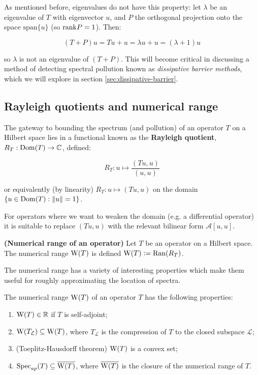 \documentclass[../main.tex]{subfiles}
\begin{document}
\begin{remark}
As mentioned before, eigenvalues do not have this property: let $\lambda$ be an eigenvalue of $T$ with eigenvector $u$, and $P$ the orthogonal 
projection onto the space $\mathrm{span}\{u\}$ (so $\mathrm{rank} P = 1$). Then:

$$(T+P) u = Tu + u = \lambda u + u = (\lambda + 1)u$$

so $\lambda$ is not an eigenvalue of $(T+P)$. This will become critical in discussing a method of detecting spectral pollution known as 
\emph{dissipative barrier methods}, which we will explore in section \ref{sec:dissipative-barrier}.
\end{remark}

\subsection{Rayleigh quotients and numerical range}
The gateway to bounding the spectrum (and pollution) of an operator $T$ on a Hilbert space lies in a functional known as the \textbf{Rayleigh quotient}, $R_T: \mathrm{Dom}(T) \rightarrow \mathbb{C}$, defined:

 \begin{equation*}
 R_T: u \mapsto \frac{( Tu, u )}{(u, u)}
 \end{equation*}
 
 or equivalently (by linearity) $R_T: u \mapsto (Tu, u)$ on the domain $\{u \in \mathrm{Dom}(T) : \|u\| = 1\}$.
 
 For operators where we want to weaken the domain (e.g. a differential operator) it is suitable to replace $(Tu, u)$ with the relevant bilinear form $\mathcal{A}[u, u].$

\begin{definition}{\textbf{(Numerical range of an operator)}} Let $T$ be an operator on a Hilbert space. The
numerical range $\mathrm{W}(T)$ is defined $\mathrm{W}(T) \mathrel{\mathop:}= \mathrm{Ran}(R_T)$.
\end{definition}

The numerical range has a variety of interesting properties which make them useful for roughly approximating
the location of spectra.

\begin{proposition}\label{thm:num-range-props}
The numerical range $\mathrm{W}(T)$ of an operator $T$ has the following properties:
\begin{enumerate}
\item\label{item:num-in-R} $\mathrm{W}(T) \in \mathbb{R}$ if $T$ is self-adjoint;
\item\label{item:proj-num-range} $\mathrm{W}(T_\mathcal{L}) \subseteq \mathrm{W}(T)$, where $T_\mathcal{L}$ is the compression of $T$ to the closed subspace $\mathcal{L}$;
\item (Toeplitz-Hausdorff theorem)\label{item:toeplitz-hausdorff} $\mathrm{W}(T)$ is a convex set;
\item\label{item:spec-in-num} $\mathrm{Spec}_{ap}(T) \subseteq \overline{\mathrm{W}(T)}$, where $\overline{\mathrm{W}(T)}$ is the closure of the numerical range of $T$.
\end{enumerate}
\end{proposition}
\end{document}
